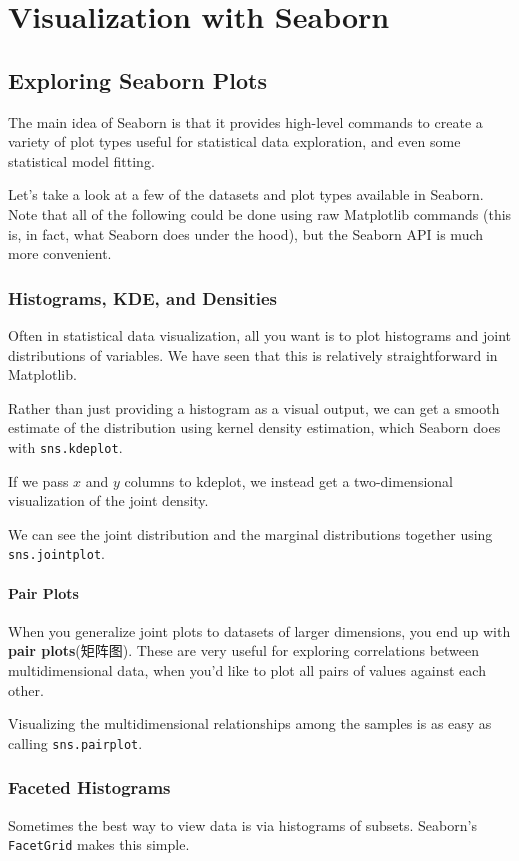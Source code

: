 \chapter{Visualization with Seaborn\label{Ch36}}
\section{Exploring Seaborn Plots}
The main idea of Seaborn is that it provides high-level commands to create a variety
of plot types useful for statistical data exploration, and even some statistical model
fitting.

Let’s take a look at a few of the datasets and plot types available in Seaborn. Note that
all of the following could be done using raw Matplotlib commands (this is, in fact,
what Seaborn does under the hood), but the Seaborn API is much more convenient.

\subsection*{Histograms, KDE, and Densities}
Often in statistical data visualization, all you want is to plot histograms and joint distributions of variables. We have seen that this is relatively straightforward in Matplotlib.


Rather than just providing a histogram as a visual output, we can get a smooth estimate of the distribution using kernel density estimation,
which Seaborn does with \verb|sns.kdeplot|.

If we pass $x$ and $y$ columns to kdeplot, we instead get a two-dimensional visualization of the joint density.

We can see the joint distribution and the marginal distributions together using
\verb|sns.jointplot|.

\subsubsection*{Pair Plots}
When you generalize joint plots to datasets of larger dimensions, you end up with
\textbf{pair plots}(矩阵图). These are very useful for exploring correlations between multidimensional
data, when you’d like to plot all pairs of values against each other.

Visualizing the multidimensional relationships among the samples is as easy as calling \verb|sns.pairplot|.

\subsection*{Faceted Histograms}
Sometimes the best way to view data is via histograms of subsets. Seaborn’s \verb|FacetGrid| makes this simple.

